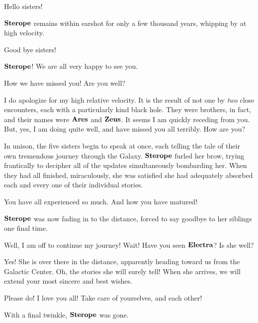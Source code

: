 \documentclass[main.tex]{subfiles}
\begin{document}
\par \Sterope Hello sisters!

\par \nar $\Sterope$ remains within earshot for only a few thousand years, whipping by at high velocity.

\par \Sterope Good bye sisters!

\par \Maia $\Sterope$!  We are all very happy to see you.

\par \Celaeno How we have missed you!  Are you well?

\par \Sterope I do apologize for my high relative velocity.  It is the result of not one by \textit{two} close encounters, each with a particularly kind black hole.  They were brothers, in fact, and their names were $\Ares$ and $\Zeus$.  It seems I am quickly receding from you.  But, yes, I am doing quite well, and have missed you all terribly.  How are you?

\par \nar In unison, the five sisters begin to speak at once, each telling the tale of their own tremendous journey through the Galaxy.  $\Sterope$ furled her brow, trying frantically to decipher all of the updates simultaneously bombarding her.  When they had all finished, miraculously, she was satisfied she had adequately absorbed each and every one of their individual stories.

\par \Sterope You have all experienced so much.  And how you have matured!  

\par \nar $\Sterope$ was now fading in to the distance, forced to say goodbye to her siblings one final time.

\par \Sterope Well, I am off to continue my journey!  Wait!  Have you seen $\Electra$?  Is she well?

\par \Celaeno Yes!  She is over there in the distance, apparently heading toward us from the Galactic Center.  Oh, the stories she will surely tell!  When she arrives, we will extend your most sincere and best wishes.

\par \Sterope Please do!  I love you all!  Take care of yourselves, and each other!

\par \nar With a final twinkle, $\Sterope$ was gone.
\end{document}
